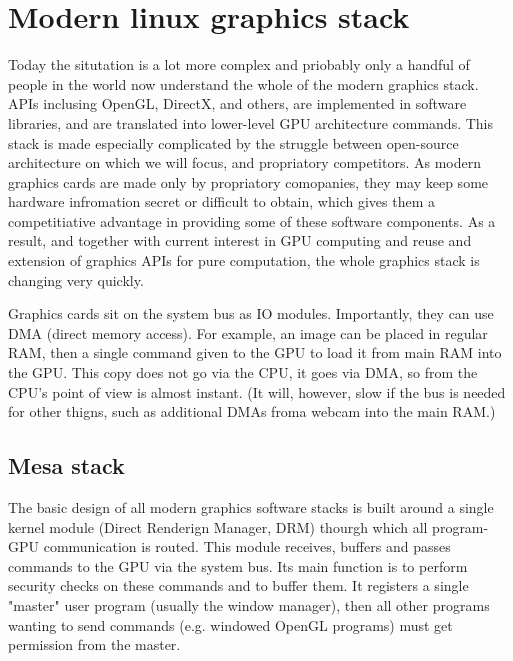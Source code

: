 \documentclass[oneside,english]{scrbook}
\begin{document}
\section{Modern linux graphics stack}


Today the situtation is a lot more complex and priobably only a handful of people in the world now understand the whole of the modern graphics stack. APIs inclusing OpenGL, DirectX, and others, are implemented in software libraries, and are translated into lower-level GPU architecture commands.   This stack is made especially complicated by the struggle between open-source architecture on which we will focus, and propriatory competitors.  As modern graphics cards are made only by propriatory comopanies, they may keep some hardware infromation secret or difficult to obtain, which gives them a competitiative advantage in providing some of these software components.  As a result, and together with current interest in GPU computing and reuse and extension of graphics APIs for pure computation, the whole graphics stack is changing very quickly.

Graphics cards sit on the system bus as IO modules.  Importantly, they can use DMA (direct memory access).  For example, an image can be placed in regular RAM, then a single command given to the GPU to load it from main RAM into the GPU.  This copy does not go via the CPU, it goes via DMA, so from the CPU's point of view is almost instant.  (It will, however, slow if the bus is needed for other thigns, such as additional DMAs froma  webcam into the main RAM.)

\subsection{Mesa stack}

The basic design of all modern graphics software stacks is built around a single kernel module (Direct Renderign Manager, DRM) thourgh which all program-GPU communication is routed. This module receives, buffers and passes commands to the GPU via the system bus. Its main function is to perform security checks on these commands and to buffer them.  It registers a single "master" user program (usually the window manager), then all other programs wanting to send commands (e.g. windowed OpenGL programs) must get permission from the master.    
\end{document}
